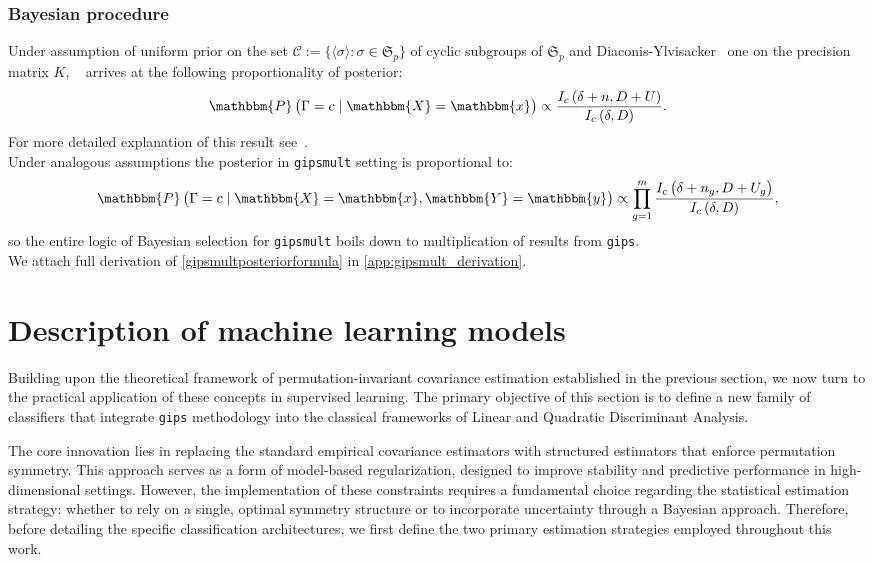 \documentclass[a4paper,11pt,twoside]{report}
\theoremstyle{definition}
\begin{document}
\subsubsection{Bayesian procedure}
Under assumption of uniform prior on the set
$
\mathcal{C} := \{ \langle \sigma \rangle : \sigma \in \mathfrak{S}_p \}
$
of cyclic subgroups of $\mathfrak{S}_p$ and Diaconis-Ylvisacker~\cite{diaconis1979conjugate} one on the precision
matrix $K$, ~\cite{JSSv112i07} arrives at the following proportionality of posterior:
\begin{equation}\label{gipsposteriorformula}
    \mathbbm{P}\left(\Gamma = c \mid \mathbbm{X} = \mathbbm{x}\right) \propto \frac{I_c\left(\delta + n, D+U\right)}{I_c\left(\delta, D\right)}.
\end{equation}
For more detailed explanation of this result see~\cite{JSSv112i07}.
\\
Under analogous assumptions the posterior in \texttt{gipsmult} setting is proportional to:
\begin{equation}\label{gipsmultposteriorformula}
    \mathbbm{P}\left(\Gamma = c \mid \mathbbm{X} = \mathbbm{x}, \mathbbm{Y} = \mathbbm{y}\right) \propto \prod_{g=1}^m\frac{I_c\left(\delta + n_g, D+U_g\right)}{I_c\left(\delta, D\right)},
\end{equation}
so the entire logic of Bayesian selection for \texttt{gipsmult} boils down to multiplication of results from \texttt{gips}.\\
We attach full derivation of \eqref{gipsmultposteriorformula} in \autoref{app:gipsmult_derivation}.



\section{Description of machine learning models}
Building upon the theoretical framework of permutation-invariant covariance estimation established in the previous section, we now turn to the practical application of these concepts in supervised learning. The primary objective of this section is to define a new family of classifiers that integrate \texttt{gips} methodology into the classical frameworks of Linear and Quadratic Discriminant Analysis.

The core innovation lies in replacing the standard empirical covariance estimators with structured estimators that enforce permutation symmetry. This approach serves as a form of model-based regularization, designed to improve stability and predictive performance in high-dimensional settings. However, the implementation of these constraints requires a fundamental choice regarding the statistical estimation strategy: whether to rely on a single, optimal symmetry structure or to incorporate uncertainty through a Bayesian approach. Therefore, before detailing the specific classification architectures, we first define the two primary estimation strategies employed throughout this work.
\end{document}
